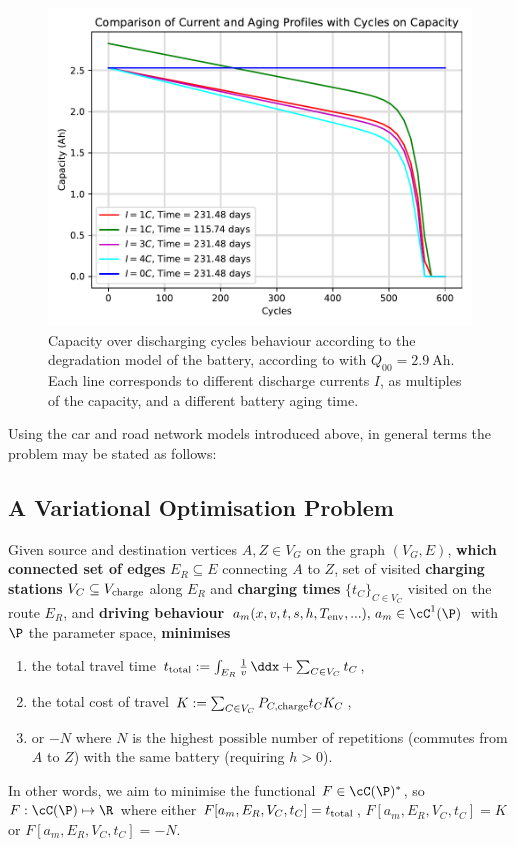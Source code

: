 \documentclass{prettytex/ox/mmsc-special-topic}
\begin{document}
  \begin{figure}[H]
    \centering
    \includegraphics[width=0.7\linewidth]{figures/aging.pdf}
    \caption{Capacity over discharging cycles behaviour according to the degradation model of the battery, according to  with $Q_{00} = \SI{2.9}{\ampere\hour}$. Each line corresponds to different discharge currents $I$, as multiples of the capacity, and a different battery aging time.}
    \label{fig:aging}
  \end{figure}

  Using the car and road network models introduced above, in general terms the problem may be stated as follows:

  \subsection{A Variational Optimisation Problem}
  \label{sec:problem}
  Given source and destination vertices $A, Z \in V_G$ on the graph $(V_G, E)$, \textbf{which connected set of edges} $E_R \subseteq E$ connecting $A$ to $Z$, set of visited \textbf{charging stations} $V_C \subseteq V_{\rm charge}$ along $E_R$ and \textbf{charging times} $\{t_C\}_{C \in V_C}$ visited on the route $E_R$, and \textbf{driving behaviour} $a_m(x, v, t, s, h, T_{\rm env}, ...),\, a_m \in \cC^1(\P)$ with $\P$ the parameter space, \textbf{minimises}
  \begin{enumerate}
    \item the total travel time $t_{\rm total} := \int_{E_R} \frac{1}{v} \,\ddx + \sum_{C \in V_C} t_C$,
    \item the total cost of travel $K := \sum_{C \in V_C} P_{C, \rm charge} t_{C} K_C$,
    \item or $-N$ where $N$ is the highest possible number of repetitions (commutes from $A$ to $Z$) with the same battery (requiring $h > 0$). \label{minoption:aging}
  \end{enumerate}
  In other words, we aim to minimise the functional $F \in \cC(\P)^*$, so $F: \cC(\P) \mapsto \R$ where either $F[a_m, E_R, V_C, t_C] = t_{\rm total}$, $F[a_m, E_R, V_C, t_C] = K$ or $F[a_m, E_R, V_C, t_C] = -N$.
\end{document}
